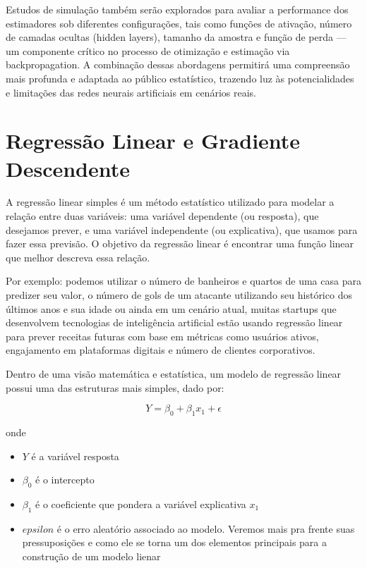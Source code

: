 \documentclass[
  letterpaper,
  DIV=11,
  numbers=noendperiod]{scrreprt}
\begin{document}
Estudos de simulação também serão explorados para avaliar a performance
dos estimadores sob diferentes configurações, tais como funções de
ativação, número de camadas ocultas (hidden layers), tamanho da amostra
e função de perda --- um componente crítico no processo de otimização e
estimação via backpropagation. A combinação dessas abordagens permitirá
uma compreensão mais profunda e adaptada ao público estatístico,
trazendo luz às potencialidades e limitações das redes neurais
artificiais em cenários reais.


\hypertarget{regressuxe3o-linear-e-gradiente-descendente}{%
\chapter{Regressão Linear e Gradiente
Descendente}\label{regressuxe3o-linear-e-gradiente-descendente}}

A regressão linear simples é um método estatístico utilizado para
modelar a relação entre duas variáveis: uma variável dependente (ou
resposta), que desejamos prever, e uma variável independente (ou
explicativa), que usamos para fazer essa previsão. O objetivo da
regressão linear é encontrar uma função linear que melhor descreva essa
relação.

Por exemplo: podemos utilizar o número de banheiros e quartos de uma
casa para predizer seu valor, o número de gols de um atacante utilizando
seu histórico dos últimos anos e sua idade ou ainda em um cenário atual,
muitas startups que desenvolvem tecnologias de inteligência artificial
estão usando regressão linear para prever receitas futuras com base em
métricas como usuários ativos, engajamento em plataformas digitais e
número de clientes corporativos.

Dentro de uma visão matemática e estatística, um modelo de regressão
linear possui uma das estruturas mais simples, dado por:

\[Y = \beta_0 +\beta_1x_1 + \epsilon\]

onde

\begin{itemize}
\item
  \(Y\) é a variável resposta
\item
  \(\beta_0\) é o intercepto
\item
  \(\beta_1\) é o coeficiente que pondera a variável explicativa \(x_1\)
\item
  \(epsilon\) é o erro aleatório associado ao modelo. Veremos mais pra
  frente suas pressuposições e como ele se torna um dos elementos
  principais para a construção de um modelo lienar
\end{itemize}
\end{document}
